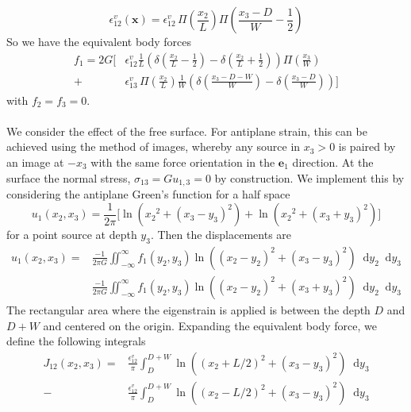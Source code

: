 \documentclass[letterpaper,12pt,]{memoir}
\newcommand*\diff{\mathop{}\!\mathrm{d}}
\begin{document}
\begin{equation}
\epsilon_{12}^v(\textbf{x})= \epsilon_{12}^v\,\Pi\left(\frac{x_2}{L}\right)\Pi\left(\frac{x_3-D}{W}-\frac{1}{2}\right)
\end{equation}
So we have the equivalent body forces
\begin{equation}
\begin{aligned}
f_1=2G\bigg[&\epsilon_{12}^v\frac{1}{L}\left(\delta\left(\frac{x_2}{L}-\frac{1}{2}\right)-\delta\left(\frac{x_2}{L}+\frac{1}{2}\right)\right)\Pi\left(\frac{x_3}{W}\right)\\
+&\epsilon_{13}^v\,\Pi\left(\frac{x_2}{L}\right)\frac{1}{W}\left(\delta\left(\frac{x_3-D-W}{W}\right)-\delta\left(\frac{x_3-D}{W}\right)\right)\bigg]
\end{aligned}
\end{equation}
with $f_2=f_3=0$. \\
%
\\
We consider the effect of the free surface. For antiplane strain, this can be achieved using the method of images, whereby any source in $x_3>0$ is paired by an image at $-x_3$ with the same force orientation in the $\textbf{e}_1$ direction. At the surface the normal stress, $\sigma_{13}=G u_{1,3}=0$ by construction. We implement this by considering the antiplane Green's function for a half space\\
\begin{equation}
u_1(x_2,x_3)=\frac{1}{2\pi}\bigg[\ln\left({x_2}^2+(x_3-y_3)^2\right) + \ln\left({x_2}^2+(x_3+y_3)^2\right)\bigg]
\end{equation}
for a point source at depth $y_3$. Then the displacements are
\begin{equation}
\begin{aligned}
u_1(x_2,x_3)=&\frac{-1}{2\pi G}\iint_{-\infty}^\infty f_1(y_2,y_3)\ln\left((x_2-y_2)^2+(x_3-y_3)^2\right)\diff y_2\diff y_3\\
&\frac{-1}{2\pi G}\iint_{-\infty}^\infty{f_1(y_2,y_3)\ln\left((x_2-y_2)^2+(x_3+y_3)^2\right)}\diff y_2\diff y_3
\end{aligned}
\end{equation}
The rectangular area where the eigenstrain is applied is between the depth $D$ and $D+W$ and centered on the origin. Expanding the equivalent body force, we define the following integrals
\begin{equation}
\begin{aligned}
J_{12}(x_2,x_3)=&
 \frac{\epsilon_{12}^v}{\pi}\int_{D}^{D+W} \ln\left((x_2+L/2)^2+(x_3-y_3)^2\right)\diff y_3\\
-&\frac{\epsilon_{12}^v}{\pi}\int_{D}^{D+W} \ln\left((x_2-L/2)^2+(x_3-y_3)^2\right)\diff y_3\\
\end{aligned}
\end{equation}
\end{document}
